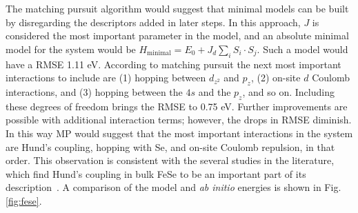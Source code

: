 The matching pursuit algorithm would suggest that minimal models can be built by disregarding the descriptors added in later steps.
In this approach, $J$ is considered the most important parameter in the model, and an absolute minimal model for the system would be $H_\text{minimal} = E_0 + J_d \sum_i S_i \cdot S_j$. 
Such a model would have a RMSE 1.11 eV. 
According to matching pursuit the next most important interactions to include are (1) hopping between $d_{z^2}$ and $p_z$, (2) on-site $d$ Coulomb interactions, and (3) hopping between the $4s$ and the $p_z$, and so on. Including these degrees of freedom brings the RMSE to 0.75 eV.
Further improvements are possible with additional interaction terms; however, the drops in RMSE diminish. 
In this way MP would suggest that the most important interactions in the system are Hund's coupling, hopping with Se, and on-site Coulomb repulsion, in that order.
This observation is consistent with the several studies in the literature, which find Hund's coupling in bulk FeSe to be an important part of its description~\cite{hunds}.
A comparison of the model and \textit{ab initio} energies is shown in Fig. \ref{fig:fese}.

